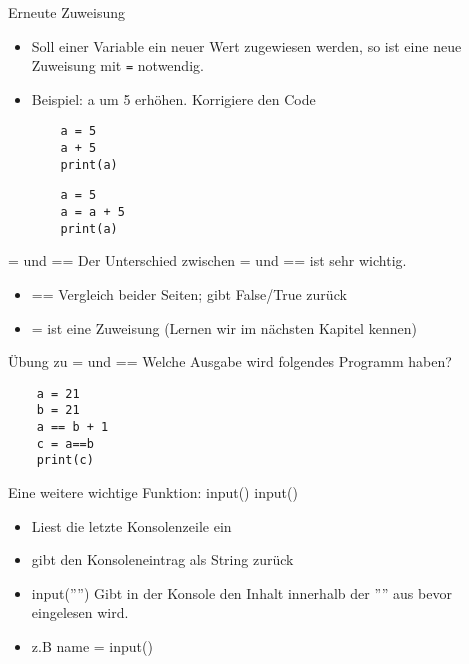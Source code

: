\begin{frame}[fragile]{Erneute Zuweisung}
\begin{itemize}
	\item Soll einer Variable ein neuer Wert zugewiesen werden, so ist eine neue Zuweisung mit  \texttt{=} notwendig.
	\item Beispiel: a um 5 erhöhen. Korrigiere den Code
	\begin{lstlisting}
	a = 5
	a + 5
	print(a)
	\end{lstlisting}
	\pause{}
	\begin{lstlisting}
	a = 5
	a = a + 5
	print(a)
	\end{lstlisting}
	
\end{itemize}
\end{frame}






\begin{frame}[fragile]{= und == }
Der Unterschied zwischen = und == ist sehr wichtig.
\begin{itemize}
\item == Vergleich beider Seiten; gibt False/True zurück
\item = ist eine Zuweisung (Lernen wir im nächsten Kapitel kennen)
\end{itemize}
\end{frame}

\begin{frame}[fragile]{Übung zu = und == }
Welche Ausgabe wird folgendes Programm haben?
	\begin{lstlisting}
	a = 21
	b = 21
	a == b + 1
	c = a==b
	print(c)
	\end{lstlisting}
\end{frame}


\begin{frame}[fragile]{Eine weitere wichtige Funktion: input()}
input()
\begin{itemize}
\item Liest die letzte Konsolenzeile ein
\item gibt den Konsoleneintrag als String zurück
\item input('''') Gibt in der Konsole den Inhalt innerhalb der '''' aus bevor eingelesen wird.
\item z.B name = input() 
\end{itemize}
\end{frame}

